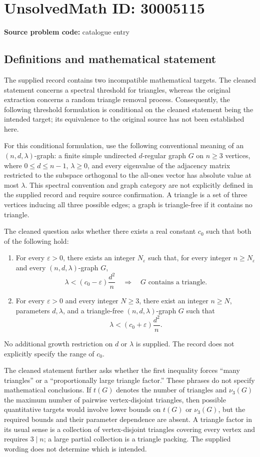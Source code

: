 \documentclass[11pt]{article}
\begin{document}
\section*{UnsolvedMath ID: 30005115}
\textbf{Source problem code:} catalogue entry
\subsection{Definitions and mathematical statement}
The supplied record contains two incompatible mathematical targets. The cleaned statement concerns a spectral threshold for triangles, whereas the original extraction concerns a random triangle removal process. Consequently, the following threshold formulation is conditional on the cleaned statement being the intended target; its equivalence to the original source has not been established here.

For this conditional formulation, use the following conventional meaning of an $(n,d,\lambda)$-graph: a finite simple undirected $d$-regular graph $G$ on $n\geq 3$ vertices, where $0\leq d\leq n-1$, $\lambda\geq 0$, and every eigenvalue of the adjacency matrix restricted to the subspace orthogonal to the all-ones vector has absolute value at most $\lambda$. This spectral convention and graph category are not explicitly defined in the supplied record and require source confirmation. A triangle is a set of three vertices inducing all three possible edges; a graph is triangle-free if it contains no triangle.

The cleaned question asks whether there exists a real constant $c_0$ such that both of the following hold:
\begin{enumerate}
\item For every $\varepsilon>0$, there exists an integer $N_{\varepsilon}$ such that, for every integer $n\geq N_{\varepsilon}$ and every $(n,d,\lambda)$-graph $G$,
\[
\lambda<(c_0-\varepsilon)\frac{d^2}{n}
\quad\Longrightarrow\quad
G\text{ contains a triangle}.
\]
\item For every $\varepsilon>0$ and every integer $N\geq 3$, there exist an integer $n\geq N$, parameters $d,\lambda$, and a triangle-free $(n,d,\lambda)$-graph $G$ such that
\[
\lambda<(c_0+\varepsilon)\frac{d^2}{n}.
\]
\end{enumerate}
No additional growth restriction on $d$ or $\lambda$ is supplied. The record does not explicitly specify the range of $c_0$.

The cleaned statement further asks whether the first inequality forces ``many triangles'' or a ``proportionally large triangle factor.'' These phrases do not specify mathematical conclusions. If $t(G)$ denotes the number of triangles and $\nu_3(G)$ the maximum number of pairwise vertex-disjoint triangles, then possible quantitative targets would involve lower bounds on $t(G)$ or $\nu_3(G)$, but the required bounds and their parameter dependence are absent. A triangle factor in its usual sense is a collection of vertex-disjoint triangles covering every vertex and requires $3\mid n$; a large partial collection is a triangle packing. The supplied wording does not determine which is intended.
\end{document}
